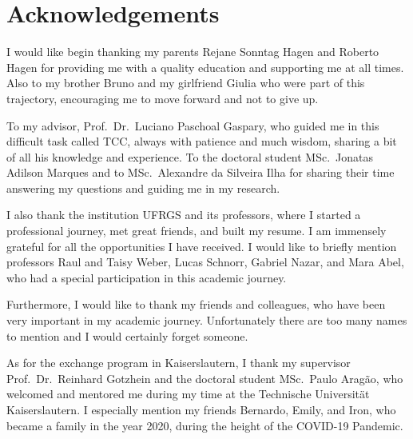 
\chapter*{Acknowledgements}

I would like begin thanking my parents Rejane Sonntag Hagen and Roberto Hagen for providing me with a quality education and supporting me at all times. Also to my brother Bruno and my girlfriend Giulia who were part of this trajectory, encouraging me to move forward and not to give up.

To my advisor, Prof.~Dr.~Luciano Paschoal Gaspary, who guided me in this difficult task called TCC, always with patience and much wisdom, sharing a bit of all his knowledge and experience. To the doctoral student MSc.~Jonatas Adilson Marques and to MSc.~Alexandre da Silveira Ilha for sharing their time answering my questions and guiding me in my research.

I also thank the institution UFRGS and its professors, where I started a professional journey, met great friends, and built my resume. I am immensely grateful for all the opportunities I have received. I would like to briefly mention professors Raul and Taisy Weber, Lucas Schnorr, Gabriel Nazar, and Mara Abel, who had a special participation in this academic journey.

Furthermore, I would like to thank my friends and colleagues, who have been very important in my academic journey. Unfortunately there are too many names to mention and I would certainly forget someone.

As for the exchange program in Kaiserslautern, I thank my supervisor Prof.~Dr.~Reinhard Gotzhein and the doctoral student MSc.~Paulo Aragão, who welcomed and mentored me during my time at the Technische Universität Kaiserslautern. I especially mention my friends Bernardo, Emily, and Iron, who became a family in the year 2020, during the height of the COVID-19 Pandemic.

